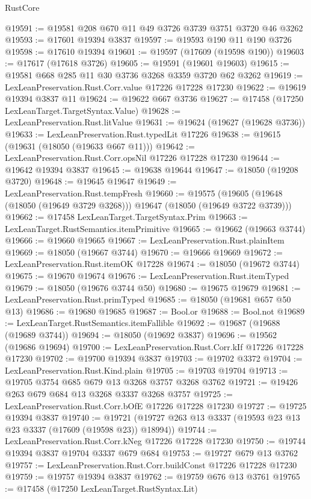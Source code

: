 \begin{lexlean}{RustCore}
\begin{coremodule}
@19591 := @19581 @208 @670 @11 @49 @3726 @3739 @3751 @3720 @46 @3262
@19593 := @17601 @19394 @3837
@19597 := @19593 @190 @11 @190 @3726
@19598 := @17610 @19394
@19601 := @19597 (@17609 (@19598 @190))
@19603 := @17617 (@17618 @3726)
@19605 := @19591 (@19601 @19603)
@19615 := @19581 @668 @285 @11 @30 @3736 @3268 @3359 @3720 @62 @3262
@19619 := LexLeanPreservation.Rust.Corr.value @17226 @17228 @17230
@19622 := @19619 @19394 @3837 @11
@19624 := @19622 @667 @3736
@19627 := @17458 (@17250 LexLeanTarget.TargetSyntax.Value)
@19628 := LexLeanPreservation.Rust.litValue
@19631 := @19624 (@19627 (@19628 @3736))
@19633 := LexLeanPreservation.Rust.typedLit @17226
@19638 := @19615 (@19631 (@18050 (@19633 @667 @11)))
@19642 := LexLeanPreservation.Rust.Corr.opsNil @17226 @17228 @17230
@19644 := @19642 @19394 @3837
@19645 := @19638 @19644
@19647 := @18050 (@19208 @3720)
@19648 := @19645 @19647
@19649 := LexLeanPreservation.Rust.tempFresh
@19660 := @19575
    (@19605 (@19648 (@18050 (@19649 @3729 @3268))) @19647 (@18050 (@19649 @3722 @3739)))
@19662 := @17458 LexLeanTarget.TargetSyntax.Prim
@19663 := LexLeanTarget.RustSemantics.itemPrimitive
@19665 := @19662 (@19663 @3744)
@19666 := @19660 @19665
@19667 := LexLeanPreservation.Rust.plainItem
@19669 := @18050 (@19667 @3744)
@19670 := @19666 @19669
@19672 := LexLeanPreservation.Rust.itemOK @17228
@19674 := @18050 (@19672 @3744)
@19675 := @19670 @19674
@19676 := LexLeanPreservation.Rust.itemTyped
@19679 := @18050 (@19676 @3744 @50)
@19680 := @19675 @19679
@19681 := LexLeanPreservation.Rust.primTyped
@19685 := @18050 (@19681 @657 @50 @13)
@19686 := @19680 @19685
@19687 := Bool.or
@19688 := Bool.not
@19689 := LexLeanTarget.RustSemantics.itemFallible
@19692 := @19687 (@19688 (@19689 @3744))
@19694 := @18050 (@19692 @3837)
@19696 := @19562 (@19686 @19694)
@19700 := LexLeanPreservation.Rust.Corr.kIf @17226 @17228 @17230
@19702 := @19700 @19394 @3837
@19703 := @19702 @3372
@19704 := LexLeanPreservation.Rust.Kind.plain
@19705 := @19703 @19704
@19713 := @19705 @3754 @685 @679 @13 @3268 @3757 @3268 @3762
@19721 := @19426 @263 @679 @684 @13 @3268 @3337 @3268 @3757
@19725 := LexLeanPreservation.Rust.Corr.bOfE @17226 @17228 @17230
@19727 := @19725 @19394 @3837
@19740 := @19721 (@19727 @263 @13 @3337 (@19593 @23 @13 @23 @3337 (@17609 (@19598 @23)) @18994))
@19744 := LexLeanPreservation.Rust.Corr.kNeg @17226 @17228 @17230
@19750 := @19744 @19394 @3837 @19704 @3337 @679 @684
@19753 := @19727 @679 @13 @3762
@19757 := LexLeanPreservation.Rust.Corr.buildConst @17226 @17228 @17230
@19759 := @19757 @19394 @3837
@19762 := @19759 @676 @13 @3761
@19765 := @17458 (@17250 LexLeanTarget.RustSyntax.Lit)

\end{coremodule}
\end{lexlean}
